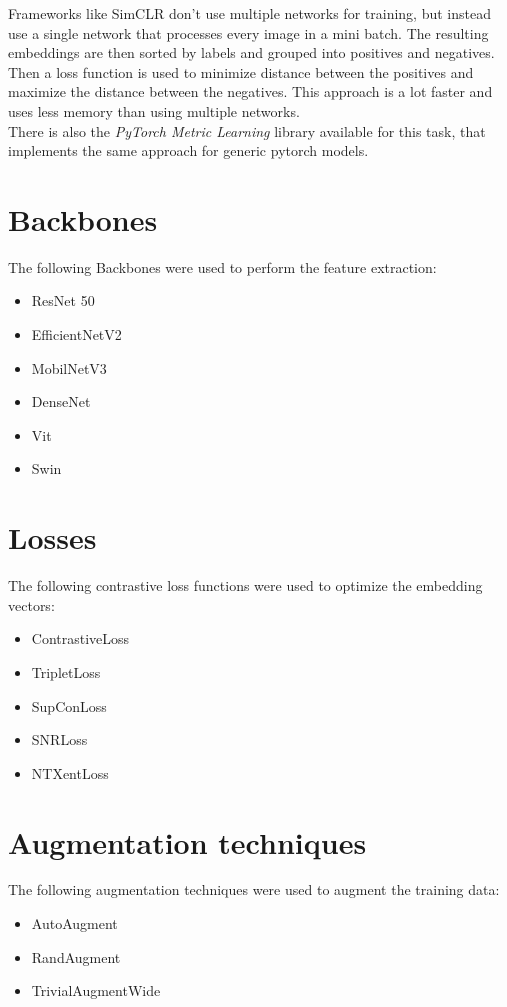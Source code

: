 \documentclass[12pt,a4paper]{report}
\begin{document}
Frameworks like SimCLR\cite{simclr} don't use multiple networks for training, but instead use a single network that processes every image in a mini batch.
The resulting embeddings are then sorted by labels and grouped into positives and negatives.
Then a loss function is used to minimize distance between the positives and maximize the distance between the negatives.
This approach is a lot faster and uses less memory than using multiple networks.
\\
There is also the \textit{PyTorch Metric Learning}\cite{musgrave2020pytorch} library available for this task, that implements the same approach for generic pytorch models.

\section{Backbones}
The following Backbones were used to perform the feature extraction:
\begin{itemize}
	\item ResNet 50 \cite{resnet}
 	\item EfficientNetV2 \cite{EfficientNetV2}
  	\item MobilNetV3 \cite{MobilNetV3}
    \item DenseNet \cite{DenseNet}
    \item Vit \cite{ViT}
    \item Swin \cite{liu2021swin}
\end{itemize}

\section{Losses}
The following contrastive loss functions were used to optimize the embedding vectors:
\begin{itemize}
	\item ContrastiveLoss \cite{ContrastiveLoss}
 	\item TripletLoss \cite{TripletLoss}
  	\item SupConLoss \cite{SupConLoss}
    \item SNRLoss \cite{SNRLoss}
    \item NTXentLoss \cite{simclr}
\end{itemize}

\newpage

\section{Augmentation techniques}
The following augmentation techniques were used to augment the training data:
\begin{itemize}
	\item AutoAugment \cite{AutoAugment}
 	\item RandAugment \cite{RandAugment}
  	\item TrivialAugmentWide \cite{TrivialAugmentWide}
\end{itemize}
\end{document}
